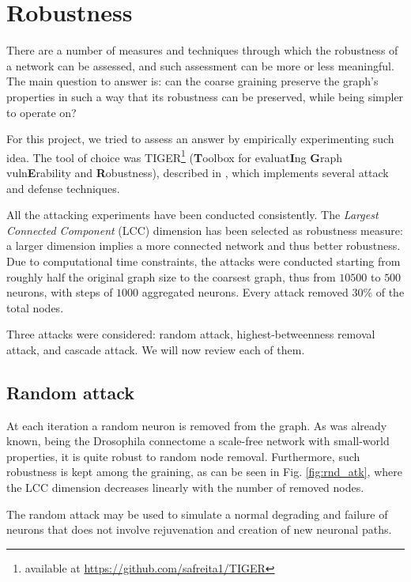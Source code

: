 \section{Robustness}
There are a number of measures and techniques through which the robustness of a network can be assessed, and such assessment can be more or less meaningful. The main question to answer is: can the coarse graining preserve the graph's properties in such a way that its robustness can be preserved, while being simpler to operate on?

For this project, we tried to assess an answer by empirically experimenting such idea. The tool of choice was TIGER\footnote{available at \href{https://github.com/safreita1/TIGER}{https://github.com/safreita1/TIGER}} (\textbf{T}oolbox for evaluat\textbf{I}ng \textbf{G}raph vuln\textbf{E}rability and \textbf{R}obustness), described in \cite{freitas2020tiger}, which implements several attack and defense techniques. 

All the attacking experiments have been conducted consistently. The \textit{Largest Connected Component} (LCC) dimension has been selected as robustness measure: a larger dimension implies a more connected network and thus better robustness. Due to computational time constraints, the attacks were conducted starting from roughly half the original graph size to the coarsest graph, thus from $10500$ to $500$ neurons, with steps of $1000$ aggregated neurons. Every attack removed 30\% of the total nodes.

Three attacks were considered: random attack, highest-betweenness removal attack, and cascade attack. We will now review each of them.

\subsection{Random attack}
At each iteration a random neuron is removed from the graph. As was already known, being the Drosophila connectome a scale-free network with small-world properties, it is quite robust to random node removal. Furthermore, such robustness is kept among the graining, as can be seen in Fig. \ref{fig:rnd_atk}, where the LCC dimension decreases linearly with the number of removed nodes. 

The random attack may be used to simulate a normal degrading and failure of neurons that does not  involve rejuvenation and creation of new neuronal paths. 

